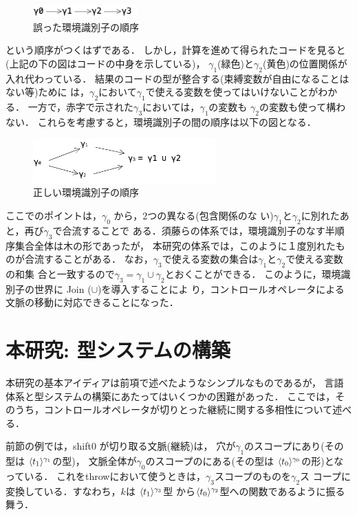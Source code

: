 \begin{figure}[ht]
  \centering
  \includegraphics[clip,width=4cm]{./img/gamma_normal.png}
  \caption{誤った環境識別子の順序}
  \label{fig:gamma_normal}
\end{figure}

という順序がつくはずである．
しかし，計算を進めて得られたコードを見ると(上記の下の図はコードの中身を示している)，
$\gamma_1$(緑色)と$\gamma_2$(黄色)の位置関係が入れ代わっている．
結果のコードの型が整合する(束縛変数が自由になることはない等)ために
は，$\gamma_2$において$\gamma_1$で使える変数を使ってはいけないことがわかる．
一方で，赤字で示された$\gamma_3$においては，$\gamma_1$の変数も
$\gamma_2$の変数も使って構わない．
これらを考慮すると，環境識別子の間の順序は以下の図となる．

\begin{figure}[ht]
  \centering
  \includegraphics[clip,width=7cm]{./img/gamma.png}
  \caption{正しい環境識別子の順序}
  \label{fig:gamma}
\end{figure}

ここでのポイントは，$\gamma_0$ から，2つの異なる(包含関係のな
い)$\gamma_1$と$\gamma_2$に別れたあと，再び$\gamma_3$で合流することで
ある．須藤らの体系では，環境識別子のなす半順序集合全体は木の形であったが，
本研究の体系では，このように１度別れたものが合流することがある．
なお，$\gamma_3$で使える変数の集合は$\gamma_1$と$\gamma_2$で使える変数の和集
合と一致するので$\gamma_3 = \gamma_1 \cup \gamma_2$とおくことができる．
このように，環境識別子の世界に Join ($\cup$)を導入することによ
り，コントロールオペレータによる文脈の移動に対応できることになった．

\section{本研究: 型システムの構築}

本研究の基本アイディアは前項で述べたようなシンプルなものであるが，
言語体系と型システムの構築にあたってはいくつかの困難があった．
ここでは，そのうち，コントロールオペレータが切りとった継続に関する多相性について述べる．

前節の例では，shift0 が切り取る文脈(継続)は，
穴が$\gamma_1$のスコープにあり(その型は $\langle{t_1}\rangle^{\gamma_1}$の型)，
文脈全体が$\gamma_0$のスコープのにある(その型は
$\langle{t_0}\rangle^{\gamma_0}$の形)となっている．
これをthrowにおいて使うときは，$\gamma_3$スコープのものを$\gamma_2$ス
コープに変換している．すなわち，$k$は $\langle{t_1}\rangle^{\gamma_3}$型
から$\langle{t_0}\rangle^{\gamma_2}$型への関数であるように振る舞う．

